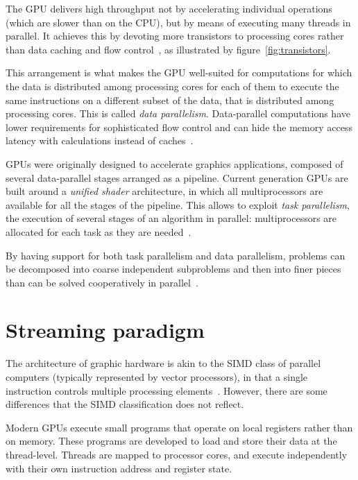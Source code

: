 The GPU delivers high throughput not by accelerating individual operations
(which are slower than on the CPU),
but by means of executing many threads in parallel.
It achieves this by devoting more transistors to processing cores
rather than data caching and flow control~\cite[\S1]{cudaprog2},
as illustrated by figure~\ref{fig:transistors}.

This arrangement is what makes the GPU
well-suited for computations
for which the data is distributed among processing cores
for each of them to execute the same instructions
on a different subset of the data,
that is distributed among processing cores.
This is called \emph{data parallelism}.
Data-parallel computations have lower requirements
for sophisticated flow control
and can hide the memory access latency with calculations
instead of caches~\cite[\S1.2]{cudaprog2}.

GPUs were originally designed to accelerate graphics applications,
composed of several data-parallel stages arranged as a pipeline.
Current generation GPUs are built around a \emph{unified shader} architecture,
in which all multiprocessors are available for all the stages of the pipeline.
This allows to exploit \emph{task parallelism},
the execution of several stages of an algorithm in parallel:
multiprocessors are allocated for each task as they are needed~\cite[\S{}II]{owens08}.

By having support for both task parallelism and data parallelism,
problems can be decomposed into coarse independent subproblems
and then into finer pieces
than can be solved cooperatively in parallel~\cite[\S1.1]{cudaprog2}.

\section{Streaming paradigm}

The architecture of graphic hardware
is akin to the SIMD class of parallel computers
(typically represented by vector processors),
in that a single instruction controls multiple processing elements~\cite[\S3.1]{cudaprog2}.
However, there are some differences that the SIMD classification does not reflect.

Modern GPUs execute small programs that operate on local registers rather than on memory.
These programs are developed to load and store their data at the thread-level.
Threads are mapped to processor cores, and execute independently
with their own instruction address and register state.


